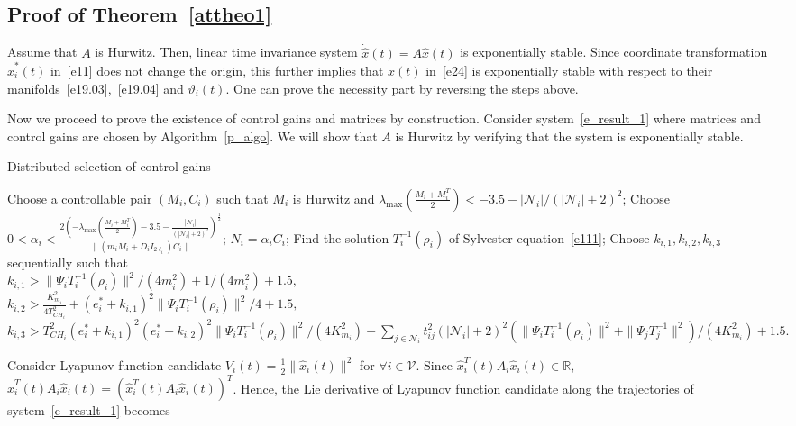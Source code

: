 \documentclass[journal]{IEEEtran}
\newcommand{\lbd}{{\lambda}}
\newcommand{\NN}{{\mathcal{N}}}
\newcommand{\VV}{{\mathcal{V}}}
\begin{document}
\subsection{Proof of Theorem~\ref{attheo1}}
Assume that $A$ is Hurwitz. Then, linear time invariance system $\dot{\hat{x}}(t)=A\hat{x}(t)$ is exponentially stable.
Since coordinate transformation $\hat{x}_i^*(t)$ in~\eqref{e11} does not change the origin, this further implies that $x(t)$ in~\eqref{e24} is exponentially stable with respect to their manifolds~\eqref{e19.03},~\eqref{e19.04} and $\vartheta_i(t)$. One can prove the necessity part by reversing the steps above.

Now we proceed to prove the existence of control gains and matrices by construction. 
Consider system~\eqref{e_result_1} where matrices and control gains are chosen by Algorithm~\ref{p_algo}. We will show that $A$ is Hurwitz by verifying that the system is exponentially stable. 
\begin{algorithm}[t] \caption{Distributed selection of control gains} \label{p_algo}
\begin{algorithmic}[1]
\FOR{$i \in {\VV}$}
\STATE Choose a controllable pair $(M_i,C_i)$ such that $M_i$ is Hurwitz and $\lbd_{\max}(\frac{M_i+M_i^T}{2})<-3.5-|{\NN}_i|/(|{\NN}_i|+2)^2$;
\STATE Choose $0<\alpha_i < \frac{2 (-\lbd_{\max}(\frac{M_i+M_i^T}{2})-3.5-\frac{|{\NN}_i|}{(|{\NN}_i|+2)^2})^{\frac{1}{2}}}{\|(m_iM_i+D_i I_{2\ell_i})C_i\|}$;
\STATE $N_i = \alpha_i C_i$;
\STATE Find the solution $T_i^{-1}(\rho_i)$ of Sylvester equation~\eqref{e111};
\ENDFOR
\FOR{$i \in {\VV}$}
\STATE Choose $k_{i,1},k_{i,2},k_{i,3}$ sequentially such that\\
$k_{i,1} > \|\Psi_iT_i^{-1}(\rho_i)\|^2/(4 m_i^2)+1/(4m_i^2)+1.5,$\\ $k_{i,2} > \frac{K_{m_i}^2}{4T_{CH_i}^2}+(e^*_i+k_{i,1})^2\|\Psi_iT_i^{-1}(\rho_i)\|^2/4+1.5,$\\ $k_{i,3} > T_{CH_i}^2(e^*_i+k_{i,1})^2(e^*_i+k_{i,2})^2\|\Psi_iT_i^{-1}(\rho_i)\|^2/(4K_{m_i}^2)+\sum_{j \in {{\NN}}_i}t_{ij}^2(|{{\NN}}_i|+2)^2(\|\Psi_iT_i^{-1}(\rho_i)\|^2+\|\Psi_jT_j^{-1}\|^2)/(4K_{m_i}^2)+1.5.$
\ENDFOR
\end{algorithmic}
\end{algorithm}
Consider Lyapunov function candidate
$V_{i}(t)=\frac{1}{2} \|\hat{x}_{i}(t)\|^2$ for $\forall i \in {\VV}$.
Since $\hat{x}_{i}^T(t) A_i \hat{x}_{i}(t) \in {\mathbb R}$, $\hat{x}_{i}^T(t) A_i \hat{x}_{i}(t)=(\hat{x}_{i}^T(t) A_i \hat{x}_{i}(t))^T$. Hence, the Lie derivative of Lyapunov function candidate along the trajectories of system~\eqref{e_result_1} becomes
\end{document}
